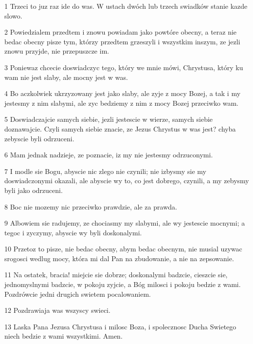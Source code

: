 \par 1 Trzeci to juz raz ide do was. W ustach dwóch lub trzech swiadków stanie kazde slowo.
\par 2 Powiedzialem przedtem i znowu powiadam jako powtóre obecny, a teraz nie bedac obecny pisze tym, którzy przedtem grzeszyli i wszystkim inszym, ze jezli znowu przyjde, nie przepuszcze im.
\par 3 Poniewaz chcecie doswiadczyc tego, który we mnie mówi, Chrystusa, który ku wam nie jest slaby, ale mocny jest w was.
\par 4 Bo aczkolwiek ukrzyzowany jest jako slaby, ale zyje z mocy Bozej, a tak i my jestesmy z nim slabymi, ale zyc bedziemy z nim z mocy Bozej przeciwko wam.
\par 5 Doswiadczajcie samych siebie, jezli jestescie w wierze, samych siebie doznawajcie. Czyli samych siebie znacie, ze Jezus Chrystus w was jest? chyba zebyscie byli odrzuceni.
\par 6 Mam jednak nadzieje, ze poznacie, iz my nie jestesmy odrzuconymi.
\par 7 I modle sie Bogu, abyscie nic zlego nie czynili; nie izbysmy sie my doswiadczonymi okazali, ale abyscie wy to, co jest dobrego, czynili, a my zebysmy byli jako odrzuceni.
\par 8 Boc nie mozemy nic przeciwko prawdzie, ale za prawda.
\par 9 Albowiem sie radujemy, ze chociasmy my slabymi, ale wy jestescie mocnymi; a tegoc i zyczymy, abyscie wy byli doskonalymi.
\par 10 Przetoz to pisze, nie bedac obecny, abym bedac obecnym, nie musial uzywac srogosci wedlug mocy, która mi dal Pan na zbudowanie, a nie na zepsowanie.
\par 11 Na ostatek, bracia! miejcie sie dobrze; doskonalymi badzcie, cieszcie sie, jednomyslnymi badzcie, w pokoju zyjcie, a Bóg milosci i pokoju bedzie z wami. Pozdrówcie jedni drugich swietem pocalowaniem.
\par 12 Pozdrawiaja was wszyscy swieci.
\par 13 Laska Pana Jezusa Chrystusa i milosc Boza, i spolecznosc Ducha Swietego niech bedzie z wami wszystkimi. Amen.


